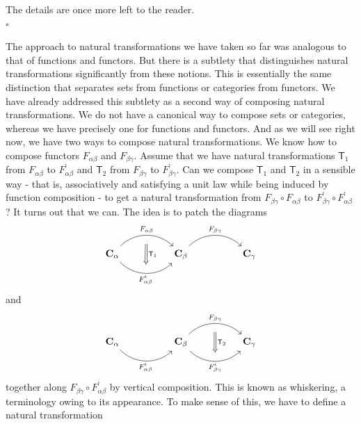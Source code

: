\begin{prf}
The details are once more left to the reader.
\\
\phantom{proven}
\hfill
$\square$
\end{prf}
The approach to natural transformations we have taken so far was analogous to that of functions and functors.
But there is a subtlety that distinguishes natural transformations significantly from these notions.
This is essentially the same distinction that separates sets from functions or categories from functors.
We have already addressed this subtlety as a second way of composing natural transformations.
We do not have a canonical way to compose sets or categories, whereas we have precisely one for functions and functors.
And as we will see right now, we have two ways to compose natural transformations.
We know how to compose functors $F_{\alpha\beta}$ and $F_{\beta\gamma}$.
Assume that we have natural transformations $\mathsf{T}_{1}$ from $F_{\alpha\beta}$ to $F_{\alpha\beta}^{\backprime}$ and $\mathsf{T}_{2}$ from $F_{\beta\gamma}$ to $F_{\beta\gamma}^{\backprime}$.
Can we compose $\mathsf{T}_{1}$ and $\mathsf{T}_{2}$ in a sensible way - that is, associatively and satisfying a unit law while being induced by function composition - to get a natural transformation from $F_{\beta\gamma} \circ F_{\alpha\beta}$ to $F_{\beta\gamma}^{\backprime} \circ F_{\alpha\beta}^{\backprime}$?
It turns out that we can.
The idea is to patch the diagrams
\[
\begin{tikzcd}[sep=huge]
  \mathbf{C}_{\alpha}
  \arrow[bend left=45]{r}[name=fab]{F_{\alpha\beta}}
  \arrow[bend right=45,swap]{r}[name=fab*]{F_{\alpha\beta}^{\backprime}}
  &
  \mathbf{C}_{\beta}
  \arrow[bend left=45]{r}{F_{\beta\gamma}}
  &
  \mathbf{C}_{\gamma}
  \arrow[from=fab,to=fab*,shorten <= 9pt,shorten >= 9pt,Rightarrow]{d}{\mathsf{T}_{1}}
\end{tikzcd}
\]
and
\[
\begin{tikzcd}[sep=huge]
  \mathbf{C}_{\alpha}
  \arrow[bend right=45,swap]{r}{F_{\alpha\beta}^{\backprime}}
  &
  \mathbf{C}_{\beta}
  \arrow[bend left=45]{r}[name=fcd]{F_{\beta\gamma}}
  \arrow[bend right=45,swap]{r}[name=fcd*]{F_{\beta\gamma}^{\backprime}}
  &
  \mathbf{C}_{\gamma}
  \arrow[from=fcd,to=fcd*,shorten <= 9pt,shorten >= 9pt,Rightarrow]{d}{\mathsf{T}_{2}}
\end{tikzcd}
\]
together along $F_{\beta\gamma} \circ F_{\alpha\beta}^{\backprime}$ by vertical composition.
This is known as whiskering, a terminology owing to its appearance.
To make sense of this, we have to define a natural transformation
